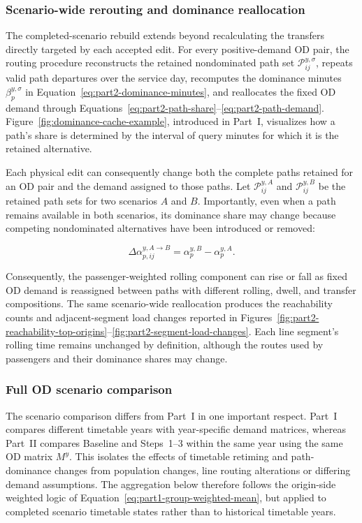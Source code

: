 \documentclass[preprint,12pt]{elsarticle}
\begin{document}
\subsubsection{Scenario-wide rerouting and dominance reallocation}\label{sec:methods-part2-rerouting-dominance}
The completed-scenario rebuild extends beyond recalculating the transfers directly targeted by each accepted edit. For every positive-demand OD pair, the routing procedure reconstructs the retained nondominated path set \(\mathcal{P}_{ij}^{y,\sigma}\), repeats valid path departures over the service day, recomputes the dominance minutes \(\beta_p^{y,\sigma}\) in Equation~\eqref{eq:part2-dominance-minutes}, and reallocates the fixed OD demand through Equations~\eqref{eq:part2-path-share}--\eqref{eq:part2-path-demand}. Figure~\ref{fig:dominance-cache-example}, introduced in Part~I, visualizes how a path's share is determined by the interval of query minutes for which it is the retained alternative.

Each physical edit can consequently change both the complete paths retained for an OD pair and the demand assigned to those paths. Let \(\mathcal{P}_{ij}^{y,A}\) and \(\mathcal{P}_{ij}^{y,B}\) be the retained path sets for two scenarios \(A\) and \(B\). Importantly, even when a path remains available in both scenarios, its dominance share may change because competing nondominated alternatives have been introduced or removed:


\begin{equation}
\Delta\alpha_{p,ij}^{y,A\to B}
=
\alpha_p^{y,B}-\alpha_p^{y,A}.
\label{eq:part2-path-share-delta}
\end{equation}

Consequently, the passenger-weighted rolling component can rise or fall as fixed OD demand is reassigned between paths with different rolling, dwell, and transfer compositions. The same scenario-wide reallocation produces the reachability counts and adjacent-segment load changes reported in Figures~\ref{fig:part2-reachability-top-origins}--\ref{fig:part2-segment-load-changes}. Each line segment's rolling time remains unchanged by definition, although the routes used by passengers and their dominance shares may change.

\subsubsection{Full OD scenario comparison}\label{sec:methods-part2-validation-comparison}
The scenario comparison differs from Part~I in one important respect. Part~I compares different timetable years with year-specific demand matrices, whereas Part~II compares Baseline and Steps~1--3 within the same year using the same OD matrix \(M^y\). This isolates the effects of timetable retiming and path-dominance changes from population changes, line routing alterations or differing demand assumptions. The aggregation below therefore follows the origin-side weighted logic of Equation~\eqref{eq:part1-group-weighted-mean}, but applied to completed scenario timetable states rather than to historical timetable years.
\end{document}
